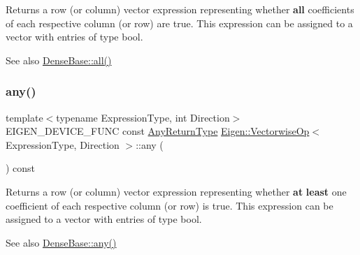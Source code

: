\begin{DoxyReturn}{Returns}
a row (or column) vector expression representing whether {\bfseries{all}} coefficients of each respective column (or row) are {\ttfamily true}. This expression can be assigned to a vector with entries of type {\ttfamily bool}.
\end{DoxyReturn}
\begin{DoxySeeAlso}{See also}
\mbox{\hyperlink{class_eigen_1_1_dense_base_ae42ab60296c120e9f45ce3b44e1761a4}{Dense\+Base\+::all()}} 
\end{DoxySeeAlso}
\mbox{\label{class_eigen_1_1_vectorwise_op_a7a513e04b7198f2fc565f636309337cc}} 
\subsubsection{\texorpdfstring{any()}{any()}}
{\footnotesize\ttfamily template$<$typename Expression\+Type, int Direction$>$ \\
E\+I\+G\+E\+N\+\_\+\+D\+E\+V\+I\+C\+E\+\_\+\+F\+U\+NC const \mbox{\hyperlink{class_eigen_1_1_partial_redux_expr}{Any\+Return\+Type}} \mbox{\hyperlink{class_eigen_1_1_vectorwise_op}{Eigen\+::\+Vectorwise\+Op}}$<$ Expression\+Type, Direction $>$\+::any (\begin{DoxyParamCaption}{ }\end{DoxyParamCaption}) const\hspace{0.3cm}{\ttfamily [inline]}}

\begin{DoxyReturn}{Returns}
a row (or column) vector expression representing whether {\bfseries{at}} {\bfseries{least}} one coefficient of each respective column (or row) is {\ttfamily true}. This expression can be assigned to a vector with entries of type {\ttfamily bool}.
\end{DoxyReturn}
\begin{DoxySeeAlso}{See also}
\mbox{\hyperlink{class_eigen_1_1_dense_base_abfbf4cb72dd577e62fbe035b1c53e695}{Dense\+Base\+::any()}} 
\end{DoxySeeAlso}
\mbox{\label{class_eigen_1_1_vectorwise_op_ae1d431dae7e328e1e6d08d2fb5dc6c22}} 
